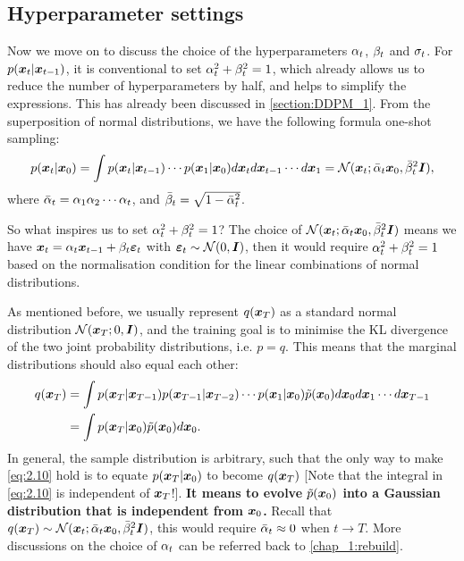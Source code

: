 \subsection{Hyperparameter settings}

Now we move on to discuss the choice of the hyperparameters $\alpha_t$, $\beta_t$ and $\sigma_t$. For $p(\bm{x}_{t}|\bm{x}_{t-1})$, it is conventional to set $\alpha_t^2+\beta_t^2=1$, which already allows us to reduce the number of hyperparameters by half, and helps to simplify the expressions. This has already been discussed in \cref{section:DDPM_1}. From the superposition of normal distributions, we have the following formula one-shot sampling:
\begin{equation}
    \label{eq:2.9}
    p(\bm{x}_{t}|\bm{x}_0)=\int p(\bm{x}_{t}|\bm{x}_{t-1})\cdots p(\bm{x}_1|\bm{x}_0)d\bm{x}_{t} d\bm{x}_{t-1}\cdots d\bm{x}_1=\mathcal{N}(\bm{x}_{t};\bar{\alpha}_t\bm{x}_0,\bar{\beta}_t^2\bm{I}),
\end{equation}
where $\bar{\alpha}_t=\alpha_1\alpha_2\cdots\alpha_t$, and $\bar{\beta}_t=\sqrt{1-\bar{\alpha}_t^2}$.

So what inspires us to set $\alpha_t^2+\beta_t^2=1$? The choice of $\mathcal{N}(\bm{x}_{t};\bar{\alpha}_t\bm{x}_0,\bar{\beta}_t^2\bm{I})$ means we have $\bm{x}_{t}=\alpha_t\bm{x}_{t-1}+\beta_t\bm{\varepsilon}_t$ with $\bm{\varepsilon}_t\sim\mathcal{N}(0,\bm{I})$, then it would require $\alpha_t^2+\beta_t^2=1$ based on the normalisation condition for the linear combinations of normal distributions.

As mentioned before, we usually represent $q(\bm{x}_T)$ as a standard normal distribution $\mathcal{N}(\bm{x}_T;0,\bm{I})$, and the training goal is to minimise the KL divergence of the two joint probability distributions, i.e. $p=q$. This means that the marginal distributions should also equal each other:
\begin{align}
    q(\bm{x}_T)&=\int p(\bm{x}_T|\bm{x}_{T-1}) p(\bm{x}_{T-1}|\bm{x}_{T-2})\cdots p(\bm{x}_1|\bm{x}_0)\tilde{p}(\bm{x}_0)d\bm{x}_0 d\bm{x}_1 \cdots d\bm{x}_{T-1} \nonumber\\
    &=\int p(\bm{x}_T|\bm{x}_0)\tilde{p}(\bm{x}_0) d\bm{x}_0. \label{eq:2.10}
\end{align}
In general, the sample distribution is arbitrary, such that the only way to make \cref{eq:2.10} hold is to equate $p(\bm{x}_T|\bm{x}_0)$ to become $q(\bm{x}_T)$ [Note that the integral in  \cref{eq:2.10} is independent of $\bm{x}_T$!]. \textbf{It means to evolve $\tilde{p}(\bm{x}_0)$ into a Gaussian distribution that is independent from $\bm{x}_0$.} Recall that $q(\bm{x}_T)\sim\mathcal{N}(\bm{x}_{t};\bar{\alpha}_t\bm{x}_0,\bar{\beta}_t^2\bm{I})$, this would require $\bar{\alpha}_t \approx 0$ when $t\to T$. More discussions on the choice of $\alpha_t$ can be referred back to \cref{chap_1:rebuild}.

